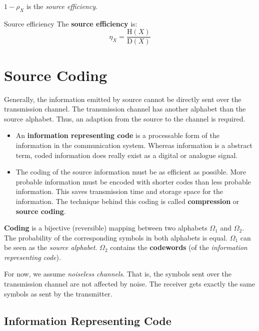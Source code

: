 \begin{refsection}
$1 - \rho_X$ is the \emph{source efficiency}.

\begin{definition}{Source efficiency}
	The  \textbf{source efficiency} is:
	\begin{equation}
		\eta_X = \frac{\mathrm{H}(X)}{\mathrm{D}(X)}
	\end{equation}
\end{definition}

\section{Source Coding}

Generally, the information emitted by source cannot be directly sent over the transmission channel. The transmission channel has another alphabet than the source alphabet. Thus, an adaption from the source to the channel is required.

\begin{itemize}
	\item An  \textbf{information representing code} is a processable form of the information in the communication system. Whereas information is a abstract term, coded information does really exist as a digital or analogue signal.
	\item The coding of the source information must be as efficient as possible. More probable information must be encoded with shorter codes than less probable information. This saves transmission time and storage space for the information. The technique behind this coding is called  \textbf{compression} or  \textbf{source coding}.
\end{itemize}

 \textbf{Coding} is a bijective (reversible) mapping between two alphabets $\Omega_1$ and $\Omega_2$. The probability of the corresponding symbols in both alphabets is equal. $\Omega_1$ can be seen as the \emph{source alphabet}. $\Omega_2$ contains the  \textbf{codewords} (of the \emph{information representing code}).

For now, we assume \emph{noiseless channels}. That is, the symbols sent over the transmission channel are not affected by noise. The receiver gets exactly the same symbols as sent by the transmitter.

\subsection{Information Representing Code}


\end{refsection}
